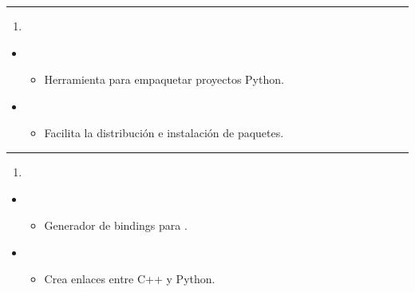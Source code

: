 \documentclass[a4paper,10pt,oneside,spanish,openany]{sphinxmanual}
\begin{document}
\bigskip\hrule\bigskip

\begin{enumerate}
%
\setcounter{enumi}{26}
\item {} 
\sphinxAtStartPar
{}

\end{enumerate}
\begin{itemize}
\item {} 
\sphinxAtStartPar
{}
\begin{itemize}
\item {} 
\sphinxAtStartPar
Herramienta para empaquetar proyectos Python.

\end{itemize}

\item {} 
\sphinxAtStartPar
{}
\begin{itemize}
\item {} 
\sphinxAtStartPar
Facilita la distribución e instalación de paquetes.

\end{itemize}

\end{itemize}


\bigskip\hrule\bigskip

\begin{enumerate}
%
\setcounter{enumi}{27}
\item {} 
\sphinxAtStartPar
{}

\end{enumerate}
\begin{itemize}
\item {} 
\sphinxAtStartPar
{}
\begin{itemize}
\item {} 
\sphinxAtStartPar
Generador de bindings para .

\end{itemize}

\item {} 
\sphinxAtStartPar
{}
\begin{itemize}
\item {} 
\sphinxAtStartPar
Crea enlaces entre C++ y Python.

\end{itemize}

\end{itemize}
\end{document}
